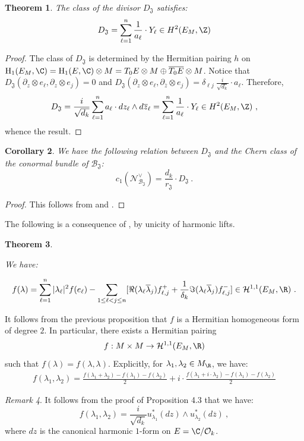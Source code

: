 \documentclass[11pt,letterpaper,english]{amsart}
\numberwithin{equation}{subsection}
\numberwithin{equation}{section}
\newcommand\cB{{\mathcal B}}
\newcommand\cH{{\mathcal H}}
\newcommand\cN{{\mathcal N}}
\newcommand\cO{{\mathcal O}}
\newcommand\fJ{{\mathfrak J}}
\theoremstyle{plain}
\newtheorem{theorem}{Theorem}[section]
\newtheorem{corollary}[theorem]{Corollary}
\theoremstyle{remark}
\newtheorem{remarque}[theorem]{Remark}
\begin{document}
\begin{theorem}\label{the-theta-class}
   The class of the divisor $D_{\fJ}$ satisfies:
    \[D_{\fJ}=\sum_{\ell=1}^{n}\frac{1}{a_\ell}\cdot Y_\ell\in{H}^2(E_M,\Z)\]
\end{theorem}
\begin{proof}
The class of $D_{\fJ}$ is determined by the Hermitian pairing $h$ on $\mathrm{H}_1(E_M,\C)=\mathrm{H}_1(E,\C)\otimes M=T_0E\otimes M\oplus\overline{T_0E}\otimes M$. Notice that $D_\fJ(\partial_z\otimes e_\ell,\partial_z\otimes e_j)=0$ and $D_\fJ(\partial_z\otimes e_\ell,\partial_{\overline z}\otimes e_j)=\delta_{\ell j}\ \frac{i}{\sqrt{d_k}}\cdot a_\ell$. Therefore,
\[D_{\fJ}=\frac{i}{\sqrt{d_k}}\sum_{\ell=1}^{n}a_\ell\cdot dz_\ell\wedge d\overline{z}_\ell=\sum_{\ell=1}^{n}\frac{1}{a_\ell}\cdot Y_\ell\in{H}^2(E_M,\Z)~,\] 
whence the result.
\end{proof}
     
\begin{corollary}\label{c:relation-normal}
    We have the following relation between $D_{\fJ}$ and the Chern class of the conormal bundle of $\cB_\fJ$:
    \[c_1(\cN_{\cB_{\fJ}}^\vee)=\frac{d_k}{r_\fJ}\cdot D_{\fJ}~.\]
\end{corollary}
\begin{proof}
    This follows from  and .
\end{proof}
The following is a consequence of , by unicity of harmonic lifts.
\begin{theorem}\label{t:decomposition-forms-codim-1} 

We have:

\[f(\lambda)=\sum_{\ell=1}^n|\lambda_\ell|^2f(e_\ell)-\sum_{1\leq \ell <j\leq n}[\Re(\lambda_\ell\overline\lambda_j)f_{\ell,j}^++\frac{1}{\delta_k}\Im(\lambda_\ell\overline\lambda_j)f_{\ell,j}^{-}]\in\cH^{1,1}(E_M,\R)~.\]

\end{theorem}

It follows from the previous proposition that $f$ is a Hermitian homogeneous form of degree $2$. In particular, there exists a Hermitian pairing 
\[f:M\times M\rightarrow \mathcal{H}^{1,1}(E_M,\R)\]
such that $f(\lambda)=f(\lambda,\lambda)$. Explicitly, for $\lambda_1,\lambda_2\in M_\R$, we have: 
\begin{align}\label{equ:sesquilinear-form}
    f(\lambda_1,\lambda_2)=\frac{f(\lambda_1+\lambda_2)-f(\lambda_1)-f(\lambda_2)}{2}+i\cdot \frac{f(\lambda_1+i\cdot\lambda_2)-f(\lambda_1)-f(\lambda_2)}{2}
\end{align}
\begin{remarque}\label{r:sesquilinear-form}
  It follows from the proof of Proposition 4.3 that we have:
  \[f(\lambda_1,\lambda_2)=\frac{i}{\sqrt{d_k}}u_{\lambda_1}^*(dz)\wedge u_{\lambda_2}^*(d\overline z)~,\]
  where $dz$ is the canonical harmonic $1$-form on $E=\C/\cO_k$.
\end{remarque}
\end{document}
